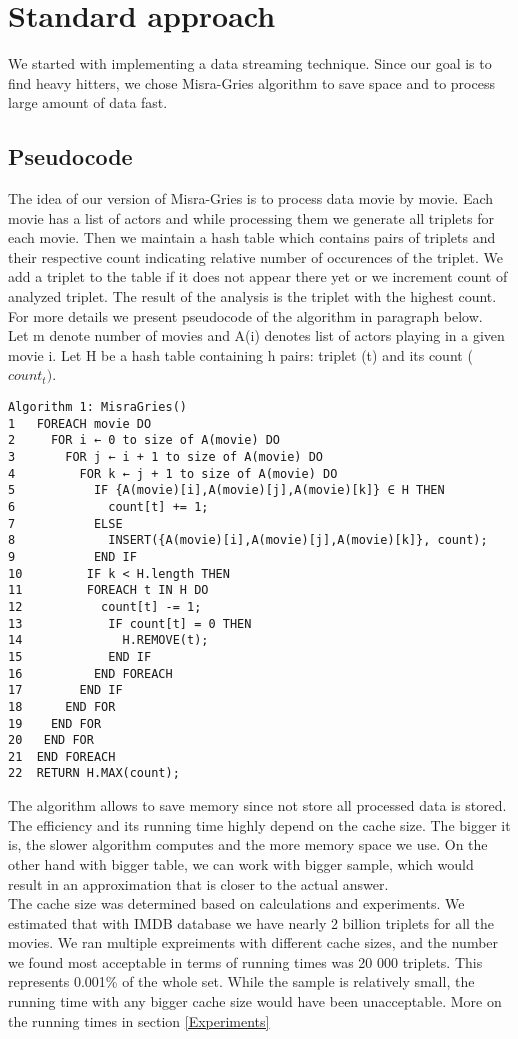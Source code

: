 \section{Standard approach}
\label{Standard}

We started with implementing a data streaming technique. Since our goal is to find heavy hitters, we chose Misra-Gries algorithm to save space and to process large amount of data fast.

\subsection{Pseudocode}
\label{MisraGries}
The idea of our version of Misra-Gries is to process data movie by movie. Each movie has a list of actors and while processing them we generate all triplets for each movie. Then we maintain a hash table which contains pairs of triplets and their respective count indicating relative number of occurences of the triplet. We add a triplet to the table if it does not appear there yet or we increment count of analyzed triplet. The result of the analysis is the triplet with the highest count. For more details we present pseudocode of the algorithm in paragraph below.
\\
Let m denote number of movies and A(i) denotes list of actors playing in a given movie i.
Let H be a hash table containing h pairs: triplet (t) and its count (\(count_t)\).
\begin{verbatim}
Algorithm 1: MisraGries()
1	FOREACH movie DO
2	  FOR i ← 0 to size of A(movie) DO
3	    FOR j ← i + 1 to size of A(movie) DO
4	      FOR k ← j + 1 to size of A(movie) DO
5	        IF {A(movie)[i],A(movie)[j],A(movie)[k]} ∈ H THEN
6	          count[t] += 1;
7	        ELSE
8	          INSERT({A(movie)[i],A(movie)[j],A(movie)[k]}, count);  
9	        END IF
10	       IF k < H.length THEN
11	       FOREACH t IN H DO
12	         count[t] -= 1;
13	          IF count[t] = 0 THEN
14	            H.REMOVE(t);
15	          END IF
16	        END FOREACH
17	      END IF      
18	    END FOR
19	  END FOR
20	 END FOR
21	END FOREACH
22	RETURN H.MAX(count);	  	                    	  
\end{verbatim}

The algorithm allows to save memory since not store all processed data is stored. The efficiency and its running time highly depend on the cache size. The bigger it is, the slower algorithm computes and the more memory space we use. On the other hand with bigger table, we can work with bigger sample, which would result in an approximation that is closer to the actual answer.
\\
The cache size was determined based on calculations and experiments. We estimated that with IMDB database we have nearly 2 billion triplets for all the movies. We ran multiple expreiments with different cache sizes, and the number we found most acceptable in terms of running times was 20 000 triplets. This represents 0.001\% of the whole set. While the sample is relatively small, the running time with any bigger cache size would have been unacceptable. More on the running times in section \ref{Experiments}
\\
